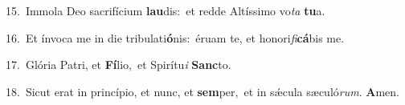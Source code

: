 {\numbfont\textcolor{\numbcolor}{15.}}~Immola Deo sacrifícium \textbf{lau}\-dis:~\star et redde Altíssimo vo\textit{ta} \textbf{tu}\-a.\par
{\numbfont\textcolor{\numbcolor}{16.}}~Et ínvoca me in die tribulati\-\textbf{ó}\-nis:~\star éruam te, et honori\-\textit{fi}\-\textbf{cá}bis me.\par
{\numbfont\textcolor{\numbcolor}{17.}}~Glória Patri, et \textbf{Fí}\-lio,~\star et Spirítu\textit{i} \textbf{Sanc}\-to.\par
{\numbfont\textcolor{\numbcolor}{18.}}~Sicut erat in princípio, et nunc, et \textbf{sem}\-per,~\star et in sǽcula sæculó\-\textit{rum}\-. \textbf{A}\-men.\par
